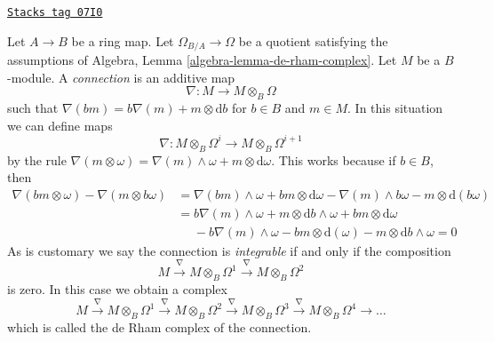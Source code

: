 \begin{remark}[Connection]
\label{crystalline-remark-connection}
\href{https://stacks.math.columbia.edu/tag/07I0}{\texttt{Stacks tag 07I0}}

Let $A \to B$ be a ring map. Let $\Omega_{B/A} \to \Omega$
be a quotient satisfying the assumptions of
Algebra, Lemma \ref{algebra-lemma-de-rham-complex}.
Let $M$ be a $B$-module. A {\it connection} is an additive map
$$
\nabla : M \longrightarrow M \otimes_B \Omega
$$
such that $\nabla(bm) = b \nabla(m) + m \otimes \text{d}b$
for $b \in B$ and $m \in M$. In this situation we can define maps
$$
\nabla : M \otimes_B \Omega^i \longrightarrow M \otimes_B \Omega^{i + 1}
$$
by the rule $\nabla(m \otimes \omega) = \nabla(m) \wedge \omega +
m \otimes \text{d}\omega$. This works because if $b \in B$, then
\begin{align*}
\nabla(bm \otimes \omega) - \nabla(m \otimes b\omega)
& =
\nabla(bm) \wedge \omega + bm \otimes \text{d}\omega
- \nabla(m) \wedge b\omega - m \otimes \text{d}(b\omega) \\
& =
b\nabla(m) \wedge \omega + m \otimes \text{d}b \wedge \omega
+ bm \otimes \text{d}\omega \\
& \ \ \ \ \ \ - b\nabla(m) \wedge \omega - bm \otimes \text{d}(\omega)
- m \otimes \text{d}b \wedge \omega = 0
\end{align*}
As is customary we say the connection is {\it integrable} if and
only if the composition
$$
M \xrightarrow{\nabla} M \otimes_B \Omega^1
\xrightarrow{\nabla} M \otimes_B \Omega^2
$$
is zero. In this case we obtain a complex
$$
M \xrightarrow{\nabla} M \otimes_B \Omega^1
\xrightarrow{\nabla} M \otimes_B \Omega^2
\xrightarrow{\nabla} M \otimes_B \Omega^3
\xrightarrow{\nabla} M \otimes_B \Omega^4 \to \ldots
$$
which is called the de Rham complex of the connection.
\end{remark}

